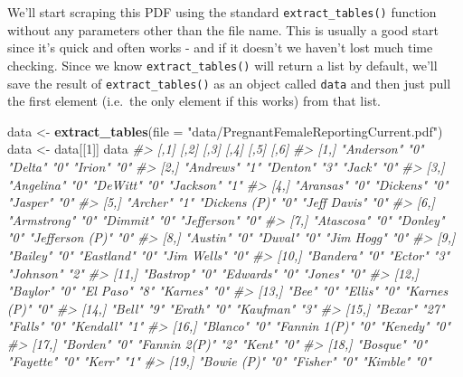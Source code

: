 \documentclass[
  12pt,
]{book}
\newenvironment{Shaded}{\begin{snugshade}}{\end{snugshade}}
\newcommand{\CommentTok}[1]{\textcolor[rgb]{0.56,0.35,0.01}{\textit{#1}}}
\newcommand{\DataTypeTok}[1]{\textcolor[rgb]{0.13,0.29,0.53}{#1}}
\newcommand{\DecValTok}[1]{\textcolor[rgb]{0.00,0.00,0.81}{#1}}
\newcommand{\KeywordTok}[1]{\textcolor[rgb]{0.13,0.29,0.53}{\textbf{#1}}}
\newcommand{\NormalTok}[1]{#1}
\newcommand{\StringTok}[1]{\textcolor[rgb]{0.31,0.60,0.02}{#1}}
\begin{document}
We'll start scraping this PDF using the standard \texttt{extract\_tables()} function without any parameters other than the file name. This is usually a good start since it's quick and often works - and if it doesn't we haven't lost much time checking. Since we know \texttt{extract\_tables()} will return a list by default, we'll save the result of \texttt{extract\_tables()} as an object called \texttt{data} and then just pull the first element (i.e.~the only element if this works) from that list.

\begin{Shaded}
\begin{Highlighting}[]
\NormalTok{data <{-}}\StringTok{ }\KeywordTok{extract\_tables}\NormalTok{(}\DataTypeTok{file =} \StringTok{"data/PregnantFemaleReportingCurrent.pdf"}\NormalTok{)}
\NormalTok{data <{-}}\StringTok{ }\NormalTok{data[[}\DecValTok{1}\NormalTok{]]}
\NormalTok{data}
\CommentTok{\#>       [,1]            [,2] [,3]          [,4] [,5]            [,6]}
\CommentTok{\#>  [1,] "Anderson"      "0"  "Delta"       "0"  "Irion"         "0" }
\CommentTok{\#>  [2,] "Andrews"       "1"  "Denton"      "3"  "Jack"          "0" }
\CommentTok{\#>  [3,] "Angelina"      "0"  "DeWitt"      "0"  "Jackson"       "1" }
\CommentTok{\#>  [4,] "Aransas"       "0"  "Dickens"     "0"  "Jasper"        "0" }
\CommentTok{\#>  [5,] "Archer"        "1"  "Dickens (P)" "0"  "Jeff Davis"    "0" }
\CommentTok{\#>  [6,] "Armstrong"     "0"  "Dimmit"      "0"  "Jefferson"     "0" }
\CommentTok{\#>  [7,] "Atascosa"      "0"  "Donley"      "0"  "Jefferson (P)" "0" }
\CommentTok{\#>  [8,] "Austin"        "0"  "Duval"       "0"  "Jim Hogg"      "0" }
\CommentTok{\#>  [9,] "Bailey"        "0"  "Eastland"    "0"  "Jim Wells"     "0" }
\CommentTok{\#> [10,] "Bandera"       "0"  "Ector"       "3"  "Johnson"       "2" }
\CommentTok{\#> [11,] "Bastrop"       "0"  "Edwards"     "0"  "Jones"         "0" }
\CommentTok{\#> [12,] "Baylor"        "0"  "El Paso"     "8"  "Karnes"        "0" }
\CommentTok{\#> [13,] "Bee"           "0"  "Ellis"       "0"  "Karnes (P)"    "0" }
\CommentTok{\#> [14,] "Bell"          "9"  "Erath"       "0"  "Kaufman"       "3" }
\CommentTok{\#> [15,] "Bexar"         "27" "Falls"       "0"  "Kendall"       "1" }
\CommentTok{\#> [16,] "Blanco"        "0"  "Fannin 1(P)" "0"  "Kenedy"        "0" }
\CommentTok{\#> [17,] "Borden"        "0"  "Fannin 2(P)" "2"  "Kent"          "0" }
\CommentTok{\#> [18,] "Bosque"        "0"  "Fayette"     "0"  "Kerr"          "1" }
\CommentTok{\#> [19,] "Bowie (P)"     "0"  "Fisher"      "0"  "Kimble"        "0" }

\end{Highlighting}
\end{Shaded}
\end{document}
